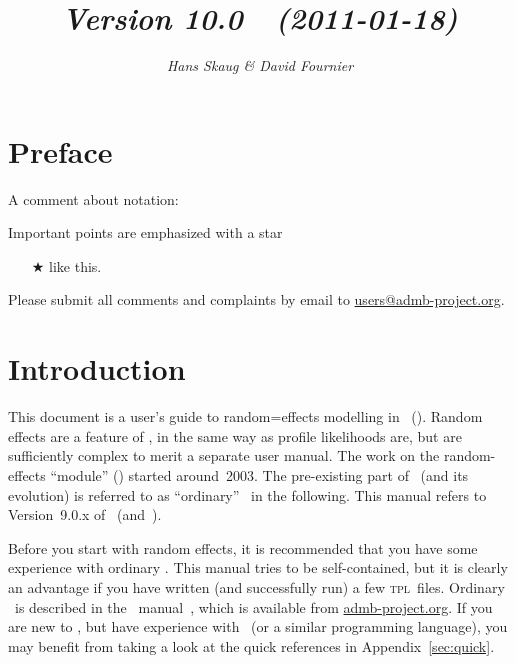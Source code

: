 \documentclass{admbmanual}
\begin{document}
\title{%
    \vspace{4.5ex}\textsf{\textit{Version 10.0~~(2011-01-18)}}\vspace{3ex}
}
\author{\textsf{\textit{Hans Skaug \& David Fournier}}}

\maketitle

\tableofcontents

\chapter*{Preface}

A comment about notation:

Important points are emphasized with a star
\begin{itemize}
\item[$\bigstar$] like this.
\end{itemize}

Please submit all comments and complaints by email to
\href{mailto:users@admb-project.org}{users@admb-project.org}.

\chapter{Introduction}

This document is a user's guide to random=effects modelling in \ADM\ (\scAB).
Random effects are a feature of \scAB, in the same way as profile likelihoods
are, but are sufficiently complex to merit a separate user manual. The work on
the random-effects ``module'' (\scAR) started around~2003. The pre-existing part
of \scAB\ (and its evolution) is referred to as ``ordinary'' \scAB\ in the
following. This manual refers to Version~9.0.x of \scAB\ (and~\scAR).

Before you start with random effects, it is recommended that you have some
experience with ordinary \scAB. This manual tries to be self-contained, but it
is clearly an advantage if you have written (and successfully run) a few
\textsc{tpl}~files. Ordinary \scAB\ is described in the \scAB\
manual~\cite{admb_manual}, which is available from
\href{mailto:admb-project.org}{admb-project.org}. If you are new to \scAB, but
have experience with \cplus\ (or a similar programming language), you may
benefit from taking a look at the quick references in Appendix~\ref{sec:quick}.
\end{document}
